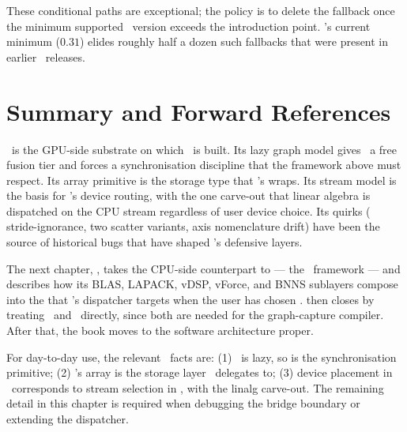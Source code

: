 These conditional paths are exceptional; the policy is to delete the
fallback once the minimum supported \MLX\ version exceeds the
introduction point. \Lucid's current minimum (\(0.31\)) elides
roughly half a dozen such fallbacks that were present in earlier
\Lucid\ releases.

\section{Summary and Forward References}
\label{sec:mlx_runtime:summary}

\MLX\ is the GPU-side substrate on which \Lucid\ is built. Its lazy
graph model gives \Lucid\ a free fusion tier and forces a
synchronisation discipline that the framework above must respect.
Its array primitive is the storage type that \Lucid's 
wraps. Its stream model is the basis for \Lucid's device routing,
with the one carve-out that linear algebra is dispatched on the CPU
stream regardless of user device choice. Its quirks
( stride-ignorance, two scatter variants, axis
nomenclature drift) have been the source of historical bugs that
have shaped \Lucid's defensive layers.

The next chapter, , takes the CPU-side
counterpart to \MLX --- the \Accelerate\ framework --- and describes
how its BLAS, LAPACK, vDSP, vForce, and BNNS sublayers compose into
the  that \Lucid's dispatcher targets when
the user has chosen .
 then closes  by
treating \Metal\ and \MPSGraph\ directly, since both are needed for
the graph-capture compiler. After that, the book moves to the
software architecture proper.

\begin{lucidnote}
For day-to-day use, the relevant \MLX\ facts are: (1) \MLX\ is lazy,
so  is the synchronisation primitive; (2) \MLX's array
is the storage layer \Lucid\ delegates to; (3) device placement in
\Lucid\ corresponds to stream selection in \MLX, with the linalg
carve-out. The remaining detail in this chapter is required when
debugging the bridge boundary or extending the dispatcher.
\end{lucidnote}
